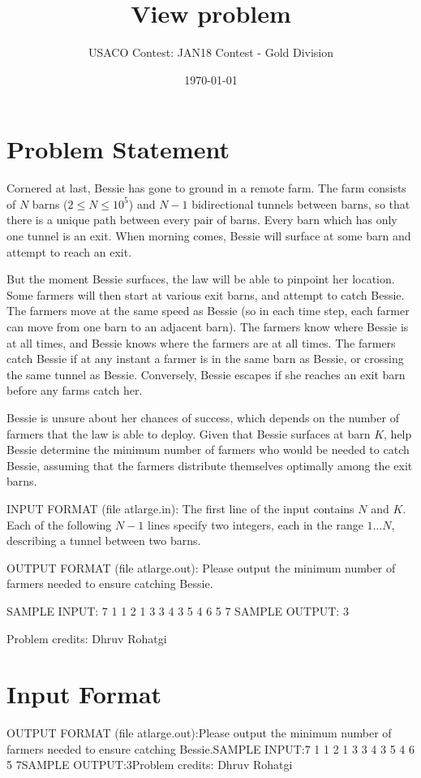 \documentclass[12pt]{article}
\title{View problem}
\author{USACO Contest: JAN18 Contest - Gold Division}
\date{\today}
\begin{document}
\maketitle

\section*{Problem Statement}

Cornered at last, Bessie has gone to ground in a remote farm. The farm consists
of $N$ barns ($2 \leq N \leq 10^5$) and $N-1$ bidirectional tunnels between
barns, so that there is a unique path between every pair of barns. Every barn
which has only one tunnel is an exit. When morning comes, Bessie will surface at
some barn and attempt to reach an exit.

But the moment Bessie surfaces, the law will be able to pinpoint her location.
Some farmers will then start at various exit barns, and attempt to catch Bessie.
The farmers move at the same speed as Bessie (so in each time step, each farmer
can move from one barn to an adjacent barn). The farmers know where Bessie is at
all times, and Bessie knows where the farmers are at all times. The farmers
catch Bessie if at any instant a farmer is in the same barn as Bessie, or
crossing the same tunnel as Bessie. Conversely, Bessie escapes if she reaches an
exit barn before any farms catch her.

Bessie is unsure about her chances of success, which depends on the number of
farmers that the law is able to deploy. Given that Bessie surfaces at barn $K$,
help Bessie determine the minimum number of farmers who would be needed to catch
Bessie, assuming that the farmers distribute themselves optimally among the exit
barns.

INPUT FORMAT (file atlarge.in):
The first line of the input contains $N$ and $K$.  Each of the following $N-1$
lines specify two integers, each in the range $1 \ldots N$, describing a tunnel
between two barns.

OUTPUT FORMAT (file atlarge.out):
Please output the minimum number of farmers needed to ensure catching Bessie.

SAMPLE INPUT:
7 1
1 2
1 3
3 4
3 5
4 6
5 7
SAMPLE OUTPUT: 
3


Problem credits: Dhruv Rohatgi



\section*{Input Format}
OUTPUT FORMAT (file atlarge.out):Please output the minimum number of farmers needed to ensure catching Bessie.SAMPLE INPUT:7 1
1 2
1 3
3 4
3 5
4 6
5 7SAMPLE OUTPUT:3Problem credits: Dhruv Rohatgi
\end{document}
